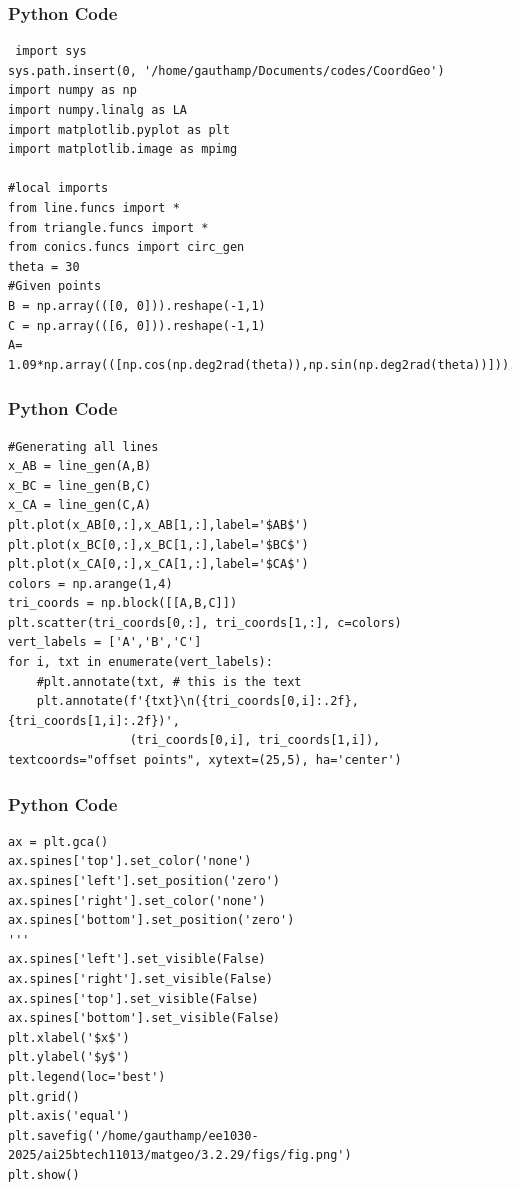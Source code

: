\documentclass{beamer}
\begin{document}
\begin{frame}[fragile]
\frametitle{Python Code}
   \begin{lstlisting}
 import sys                                     
sys.path.insert(0, '/home/gauthamp/Documents/codes/CoordGeo')  
import numpy as np
import numpy.linalg as LA
import matplotlib.pyplot as plt
import matplotlib.image as mpimg

#local imports
from line.funcs import *
from triangle.funcs import *
from conics.funcs import circ_gen
theta = 30
#Given points
B = np.array(([0, 0])).reshape(-1,1) 
C = np.array(([6, 0])).reshape(-1,1)  
A= 1.09*np.array(([np.cos(np.deg2rad(theta)),np.sin(np.deg2rad(theta))])).reshape(-1,1)  
   \end{lstlisting}
\end{frame}
\begin{frame}[fragile]
\frametitle{Python Code}
   \begin{lstlisting}
#Generating all lines
x_AB = line_gen(A,B)
x_BC = line_gen(B,C)
x_CA = line_gen(C,A)
plt.plot(x_AB[0,:],x_AB[1,:],label='$AB$')
plt.plot(x_BC[0,:],x_BC[1,:],label='$BC$')
plt.plot(x_CA[0,:],x_CA[1,:],label='$CA$')
colors = np.arange(1,4)
tri_coords = np.block([[A,B,C]])
plt.scatter(tri_coords[0,:], tri_coords[1,:], c=colors)
vert_labels = ['A','B','C']
for i, txt in enumerate(vert_labels):
    #plt.annotate(txt, # this is the text
    plt.annotate(f'{txt}\n({tri_coords[0,i]:.2f}, {tri_coords[1,i]:.2f})',
                 (tri_coords[0,i], tri_coords[1,i]), textcoords="offset points", xytext=(25,5), ha='center') 
 \end{lstlisting}
\end{frame}
\begin{frame}[fragile]
\frametitle{Python Code}
   \begin{lstlisting}
ax = plt.gca()
ax.spines['top'].set_color('none')
ax.spines['left'].set_position('zero')
ax.spines['right'].set_color('none')
ax.spines['bottom'].set_position('zero')
'''
ax.spines['left'].set_visible(False)
ax.spines['right'].set_visible(False)
ax.spines['top'].set_visible(False)
ax.spines['bottom'].set_visible(False)
plt.xlabel('$x$')
plt.ylabel('$y$')
plt.legend(loc='best')
plt.grid() 
plt.axis('equal')
plt.savefig('/home/gauthamp/ee1030-2025/ai25btech11013/matgeo/3.2.29/figs/fig.png')
plt.show() 
   \end{lstlisting}
\end{frame}
\end{document}
